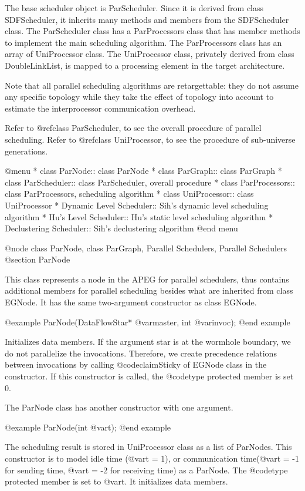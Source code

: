 The base scheduler object is ParScheduler. Since it is derived from class
SDFScheduler, it inherits many methods and members from the SDFScheduler
class. The ParScheduler class has a ParProcessors class that has
member methods to implement the main scheduling algorithm. The ParProcessors
class has an array of UniProcessor class. The UniProcessor class,
privately derived from class DoubleLinkList, is mapped to a
processing element in the target architecture.

Note that all parallel scheduling algorithms are retargettable:
they do not assume any specific topology while they take the effect
of topology into account to estimate the interprocessor communication
overhead. 

Refer to @ref{class ParScheduler}, to see the overall procedure of parallel
scheduling. Refer to @ref{class UniProcessor}, to see the procedure of
sub-universe generations.

@menu
* class ParNode::		class ParNode
* class ParGraph::		class ParGraph
* class ParScheduler::		class ParScheduler, overall procedure
* class ParProcessors::		class ParProcessors, scheduling algorithm
* class UniProcessor::		class UniProcessor
* Dynamic Level Scheduler::	Sih's dynamic level scheduling algorithm
* Hu's Level Scheduler::	Hu's static level scheduling algorithm
* Declustering Scheduler::	Sih's declustering algorithm
@end menu

@node class ParNode, class ParGraph, Parallel Schedulers, Parallel Schedulers
@section ParNode

This class represents a node in the APEG for parallel schedulers, thus 
contains additional members for parallel scheduling besides what are
inherited from class EGNode. It has the same two-argument 
constructor as class EGNode.

@example
ParNode(DataFlowStar* @var{master}, int @var{invoc});
@end example

Initializes data members. If the argument star is at the wormhole
boundary, we do not parallelize the invocations. Therefore, we create
precedence relations between invocations by calling @code{claimSticky}
of EGNode class in the constructor. If this constructor is called,
the @code{type} protected member is set 0.

The ParNode class has another constructor with one argument.

@example
ParNode(int @var{t});
@end example

The scheduling result is stored in UniProcessor class as a list of
ParNodes. This constructor is to model idle time (@var{t} = 1), or
communication time(@var{t} = -1 for sending time, @var{t} = -2
for receiving time) as a ParNode. The @code{type} protected member
is set to @var{t}. It initializes data members.


